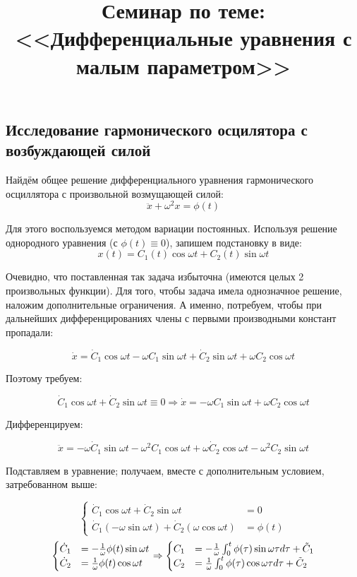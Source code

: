 \documentclass[a4paper,12pt]{article}
\begin{document}
\title{Семинар по теме: <<Дифференциальные уравнения с малым параметром>>}
\maketitle

\subsection*{Исследование гармонического осцилятора с возбуждающей силой}

Найдём общее решение дифференциального уравнения гармонического осциллятора
с произвольной возмущающей силой:
\[
\ddot{x}+\omega^{2}x=\phi(t)
\]

 \noindent
Для этого воспользуемся методом вариации постоянных. Используя решение
однородного уравнения (с $\phi(t)\equiv0$), запишем подстановку в
виде:
\[
x(t)=C_{1}(t)\cos\omega t+C_{2}(t)\sin\omega t
\]

 \noindent
Очевидно, что поставленная так задача избыточна (имеются целых 2 произвольных
функции). Для того, чтобы задача имела однозначное решение, наложим
дополнительные ограничения. А именно, потребуем, чтобы при дальнейших
дифференцированиях члены с первыми производными констант пропадали:

\[
\dot{x}=\dot{C}_{1}\cos\omega t-\omega C_{1}\sin\omega t+\dot{C}_{2}\sin\omega t+\omega C_{2}\cos\omega t
\]

 \noindent
Поэтому требуем:

\[
\dot{C}_{1}\cos\omega t+\dot{C}_{2}\sin\omega t\equiv0\Rightarrow\dot{x}=-\omega C_{1}\sin\omega t+\omega C_{2}\cos\omega t
\]

 \noindent
Дифференцируем:

\[
\ddot{x}=-\omega\dot{C}_{1}\sin\omega t-\omega^{2}C_{1}\cos\omega t+\omega\dot{C}_{2}\cos\omega t-\omega^{2}C_{2}\sin\omega t
\]

 \noindent
Подставляем в уравнение; получаем, вместе с дополнительным условием, затребованном выше:

\[
\begin{cases}
\dot{C}_{1}\cos\omega t+\dot{C}_{2}\sin\omega t & =0\\
\dot{C}_{1}\left(-\omega\sin\omega t\right)+\dot{C}_{2}\left(\omega\cos\omega t\right) & =\phi\left(t\right)
\end{cases}
\]
\[
\begin{cases}
\dot{C}_{1} & =-\frac{1}{\omega}\phi(t)\sin\omega t\\
\dot{C}_{2} & =\frac{1}{\omega}\phi(t)\cos\omega t
\end{cases}\Rightarrow
\begin{cases}
C_{1} & =-\frac{1}{\omega}\intop_{0}^{t}\phi(\tau)\sin\omega\tau d\tau+\tilde{C}_{1}\\
C_{2} & =\frac{1}{\omega}\intop_{0}^{t}\phi(\tau)\cos\omega\tau d\tau+\tilde{C}_{2}
\end{cases}
\]
\end{document}
